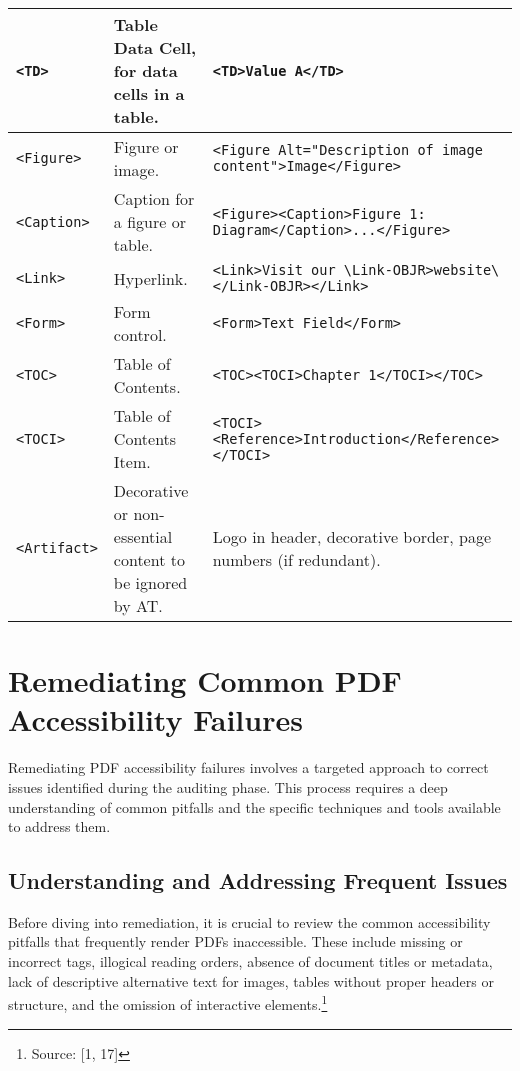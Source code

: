 \begin{longtable}{|l|l|p{6cm}|}
\hline
\texttt{<TD>} & Table Data Cell, for data cells in a table. & \texttt{<TD>Value A</TD>} \\
\hline
\texttt{<Figure>} & Figure or image. & \texttt{<Figure Alt="Description of image content">Image</Figure>} \\
\hline
\texttt{<Caption>} & Caption for a figure or table. & \texttt{<Figure><Caption>Figure 1: Diagram</Caption>...</Figure>} \\
\hline
\texttt{<Link>} & Hyperlink. & \texttt{<Link>Visit our \textbackslash Link-OBJR>website\textbackslash </Link-OBJR></Link>} \\
\hline
\texttt{<Form>} & Form control. & \texttt{<Form>Text Field</Form>} \\
\hline
\texttt{<TOC>} & Table of Contents. & \texttt{<TOC><TOCI>Chapter 1</TOCI></TOC>} \\
\hline
\texttt{<TOCI>} & Table of Contents Item. & \texttt{<TOCI><Reference>Introduction</Reference></TOCI>} \\
\hline
\texttt{<Artifact>} & Decorative or non-essential content to be ignored by AT. & Logo in header, decorative border, page numbers (if redundant). \\
\hline
\end{longtable}

\section{Remediating Common PDF Accessibility Failures}

Remediating PDF accessibility failures involves a targeted approach to correct issues identified during the auditing phase. This process requires a deep understanding of common pitfalls and the specific techniques and tools available to address them.

\subsection{Understanding and Addressing Frequent Issues}

Before diving into remediation, it is crucial to review the common accessibility pitfalls that frequently render PDFs inaccessible. These include missing or incorrect tags, illogical reading orders, absence of document titles or metadata, lack of descriptive alternative text for images, tables without proper headers or structure, and the omission of interactive elements.\footnote{Source: [1, 17]}

